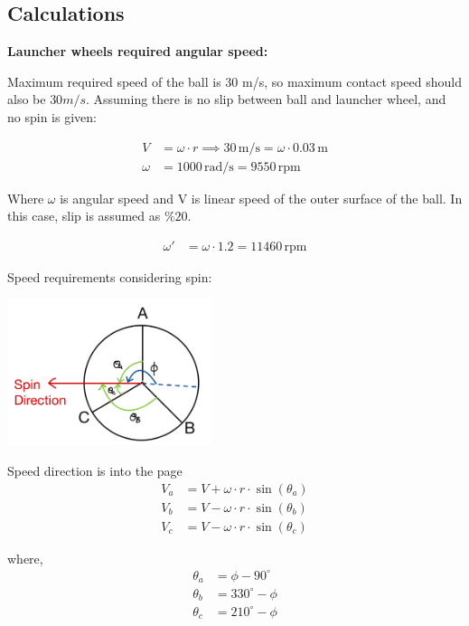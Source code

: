 \documentclass[12pt]{article}
\begin{document}
    \subsection{Calculations}


    \textbf{Launcher wheels required angular speed:}

    Maximum required speed of the ball is 30 m/s, so maximum contact speed should also be $30 m/s$. Assuming there is no slip between ball and launcher wheel, and no spin is given:

    \begin{align}
        V &= \omega \cdot r \implies 30 \, \text{m/s} = \omega \cdot 0.03 \, \text{m} \\
        \omega &= 1000 \, \text{rad/s} = 9550 \, \text{rpm}
    \end{align}
    
    Where $\omega$ is angular speed and V is linear speed of the outer surface of the ball. In this case, slip is assumed as $\%20$.
    
    \begin{align}
        \omega' &= \omega \cdot 1.2 = 11460 \, \text{rpm}
    \end{align}

    Speed requirements considering spin: 
    
    \begin{minipage}{0.48\textwidth}
        \centering
        \includegraphics[width=60mm]{calculation_graph.png}
        \label{fig:wholesales}
    \end{minipage}
    \begin{minipage}{0.48\textwidth}
    Speed direction is into the page 
    \begin{align}
        V_a &= V + \omega \cdot r \cdot \sin(\theta_a) \\
        V_b &= V - \omega \cdot r \cdot \sin(\theta_b) \\
        V_c &= V - \omega \cdot r \cdot \sin(\theta_c)
    \end{align}
    
    where,
    \begin{align}
        \theta_a &= \phi - 90^\circ \\
        \theta_b &= 330^\circ - \phi \\
        \theta_c &= 210^\circ - \phi
    \end{align}
    
    \end{minipage}
\end{document}
